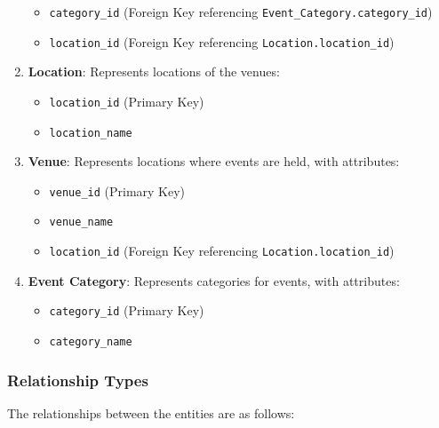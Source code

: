 \begin{enumerate}
\begin{itemize}
        \item \texttt{category\_id} (Foreign Key referencing \texttt{Event\_Category.category\_id})
        \item \texttt{location\_id} (Foreign Key referencing \texttt{Location.location\_id})
    \end{itemize}

    \item \textbf{Location}: Represents locations of the venues:
    \begin{itemize}
        \item \texttt{location\_id} (Primary Key)
        \item \texttt{location\_name}
    \end{itemize}

    \item \textbf{Venue}: Represents locations where events are held, with attributes:
    \begin{itemize}
        \item \texttt{venue\_id} (Primary Key)
        \item \texttt{venue\_name}
        \item \texttt{location\_id} (Foreign Key referencing \texttt{Location.location\_id})
    \end{itemize}

    
    \item \textbf{Event Category}: Represents categories for events, with attributes:
    \begin{itemize}
        \item \texttt{category\_id} (Primary Key)
        \item \texttt{category\_name}
    \end{itemize}
\end{enumerate}

\subsubsection{Relationship Types}

The relationships between the entities are as follows:

